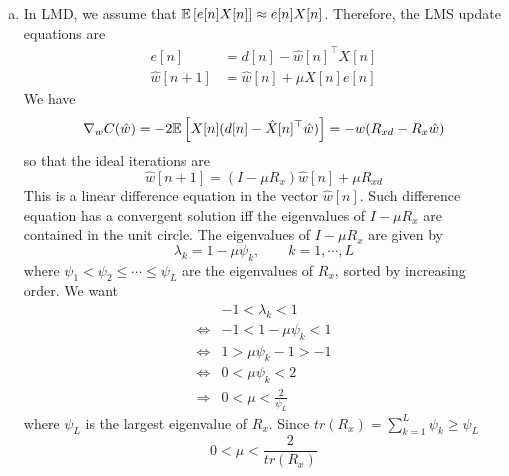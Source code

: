 \begin{enumerate}[(a)]
\item In LMD, we assume that $\mathbb{E} \left[ e[n]X[n] \right] \approx e[n]X[n]$. Therefore, the LMS update equations are
\begin{align*}
	e[n] &= d[n] - \hat{w}[n]^\top X[n] \\
	\hat{w}[n+1] &= \hat{w}[n] + \mu X[n] e[n]
\end{align*}
We have
\[\nabla_w C(\hat{w}) = -2 \mathbb{E} \left[ X[n](d[n]-\hat{X}[n]^\top\hat{w}) \right] = -w(R_{xd} - R_x\hat{w})\]
so that the ideal iterations are
\[\hat{w}[n+1] = (I - \mu R_x) \hat{w}[n] + \mu R_{xd}\]
This is a linear difference equation in the vector $\hat{w}[n]$. Such difference equation has a convergent solution iff the eigenvalues of $I - \mu R_x$ are contained in the unit circle. The eigenvalues of $I - \mu R_x$ are given by
\[\lambda_k = 1 - \mu \psi_k, \qquad k = 1, \cdots, L\]
where $\psi_1 < \psi_2 \leq \cdots \leq \psi_L$ are the eigenvalues of $R_x$, sorted by increasing order. We want 
\begin{align*}
	& -1 < \lambda_k < 1\\
	\Leftrightarrow& -1 < 1 - \mu \psi_k < 1 \\
	\Leftrightarrow& 1 > \mu \psi_k -1 > -1 \\
	\Leftrightarrow& 0 < \mu \psi_k <2 \\
	\Rightarrow& 0 < \mu < \frac{2}{\psi_L}
\end{align*}
where $\psi_L$ is the largest eigenvalue of $R_x$. Since $tr(R_x) = \sum_{k=1}^{L}\psi_k \geq \psi_L$
\[0 < \mu < \frac{2}{tr(R_x)}\]
\end{enumerate}
